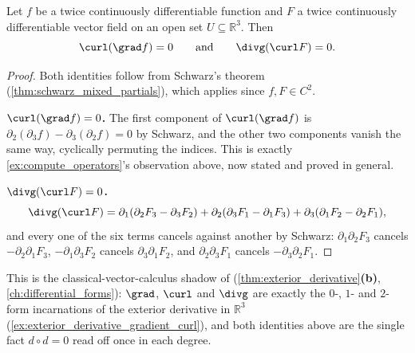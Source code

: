 \begin{proposition}[$\curl\circ\grad=0$ and $\divg\circ\curl=0$]
\label{prop:curl_grad_div_curl_zero}
Let $f$ be a twice continuously differentiable function and $F$ a twice continuously
differentiable vector field on an open set $U \subseteq \mathbb{R}^3$. Then
\[\curl(\grad f) = 0 \qquad\text{and}\qquad \divg(\curl F) = 0.\]
\end{proposition}

\begin{proof}
Both identities follow from Schwarz's theorem (\cref{thm:schwarz_mixed_partials}), which
applies since $f,F \in C^2$.

\textbf{$\curl(\grad f)=0$.} The first component of $\curl(\grad f)$ is
$\partial_2(\partial_3f) - \partial_3(\partial_2f) = 0$ by Schwarz, and the other two
components vanish the same way, cyclically permuting the indices. This is exactly
\cref{ex:compute_operators}'s observation above, now stated and proved in general.

\textbf{$\divg(\curl F)=0$.}
\[\divg(\curl F) = \partial_1(\partial_2F_3-\partial_3F_2) + \partial_2(\partial_3F_1-\partial_1F_3)
  + \partial_3(\partial_1F_2-\partial_2F_1),\]
and every one of the six terms cancels against another by Schwarz: $\partial_1\partial_2F_3$
cancels $-\partial_2\partial_1F_3$, $-\partial_1\partial_3F_2$ cancels
$\partial_3\partial_1F_2$, and $\partial_2\partial_3F_1$ cancels $-\partial_3\partial_2F_1$.
\end{proof}

\begin{remark}
This is the classical-vector-calculus shadow of 
(\cref{thm:exterior_derivative}\textbf{(b)}, \cref{ch:differential_forms}): $\grad$, $\curl$ and
$\divg$ are exactly the $0$-, $1$- and $2$-form incarnations of the exterior derivative in
$\mathbb{R}^3$ (\cref{ex:exterior_derivative_gradient_curl}), and both identities above are the
single fact $d\circ d=0$ read off once in each degree.
\end{remark}

